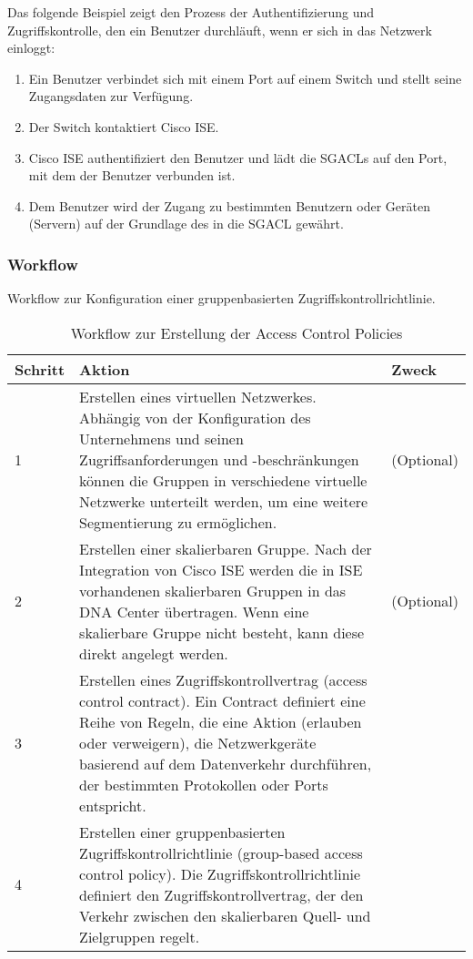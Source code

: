 Das folgende Beispiel zeigt den Prozess der Authentifizierung und Zugriffskontrolle, den ein Benutzer durchläuft, wenn er sich in das Netzwerk einloggt:
\begin{enumerate}
	\item Ein Benutzer verbindet sich mit einem Port auf einem Switch und stellt seine Zugangsdaten zur Verfügung.
	\item Der Switch kontaktiert Cisco ISE.
	\item Cisco ISE authentifiziert den Benutzer und lädt die SGACLs auf den Port, mit dem der Benutzer verbunden ist.
	\item  Dem Benutzer wird der Zugang zu bestimmten Benutzern oder Geräten (Servern) auf der Grundlage des in die SGACL gewährt.
\end{enumerate}





\subsubsection{Workflow}
Workflow zur Konfiguration einer gruppenbasierten Zugriffskontrollrichtlinie.

\begin{table}[H]
	\centering
	\begin{tabularx}{\textwidth}{p{2 cm} | X | p{2 cm}}
		\rowcolor{gray!50}
		\textbf{Schritt} & \textbf{Aktion} & \textbf{Zweck} \\
		\hline	
		1 & Erstellen eines virtuellen Netzwerkes. Abhängig von der Konfiguration des Unternehmens und seinen Zugriffsanforderungen und -beschränkungen können die Gruppen in verschiedene virtuelle Netzwerke unterteilt werden, um eine weitere Segmentierung zu ermöglichen. & (Optional) \\
		2 & Erstellen einer skalierbaren Gruppe. Nach der Integration von Cisco ISE werden die in ISE vorhandenen skalierbaren Gruppen in das DNA Center übertragen. Wenn eine skalierbare Gruppe nicht besteht, kann diese direkt angelegt werden. & (Optional) \\
		3 & Erstellen eines Zugriffskontrollvertrag (access control contract). Ein Contract definiert eine Reihe von Regeln, die eine Aktion (erlauben oder verweigern), die Netzwerkgeräte basierend auf dem Datenverkehr durchführen, der bestimmten Protokollen oder Ports entspricht. & \\
		4 & Erstellen einer gruppenbasierten Zugriffskontrollrichtlinie (group-based access control policy). Die Zugriffskontrollrichtlinie definiert den Zugriffskontrollvertrag, der den Verkehr zwischen den skalierbaren Quell- und Zielgruppen regelt. & \\
		
	\end{tabularx}
	\caption{Workflow zur Erstellung der Access Control Policies}
	\label{tab:Workflow zur Erstellung der Access Control Policies}
\end{table}


